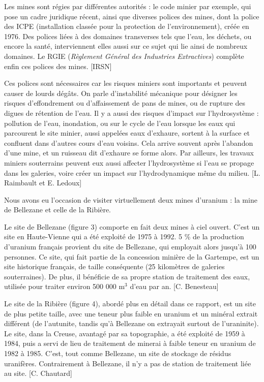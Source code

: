 \documentclass{article}
\begin{document}
Les mines sont régies par différentes autorités : le code minier par exemple, qui pose un cadre juridique récent, ainsi que diverses polices des mines, dont la police des ICPE (installation classée pour la protection de l’environnement), créée en 1976. Des polices liées à des domaines transverses tels que l’eau, les déchets, ou encore la santé, interviennent elles aussi sur ce sujet qui lie ainsi de nombreux domaines. Le RGIE (\emph{Règlement Général des Industries Extractives}) complète enfin ces polices des mines. [IRSN]

Ces polices sont nécessaires car les risques miniers sont importants et peuvent causer de lourds dégâts. On parle d’instabilité mécanique pour désigner les risques d’effondrement ou d’affaissement de pans de mines, ou de rupture des digues de rétention de l’eau. Il y a aussi des risques d’impact sur l’hydrosystème : pollution de l’eau, inondation, ou sur le cycle de l’eau lorsque les eaux qui parcourent le site minier, aussi appelées eaux d’exhaure, sortent à la surface et confluent dans d’autres cours d’eau voisins. Cela arrive souvent après l’abandon d’une mine, et un ruisseau dit d’exhaure se forme alors. Par ailleurs, les travaux miniers souterrains peuvent eux aussi affecter l’hydrosystème si l’eau se propage dans les galeries, voire créer un impact sur l’hydrodynamique même du milieu. [L. Raimbault et E. Ledoux]

Nous avons eu l’occasion de visiter virtuellement deux mines d’uranium : la mine de Bellezane et celle de la Ribière. 

Le site de Bellezane (figure 3) comporte en fait deux mines à ciel ouvert. C’est un site en Haute-Vienne qui a été exploité de 1975 à 1992. 5 \% de la production d’uranium français provient du site de Bellezane, qui employait alors jusqu’à 100 personnes. Ce site, qui fait partie de la concession minière de la Gartempe, est un site historique français, de taille conséquente (25 kilomètres de galeries souterraines). De plus, il bénéficie de sa propre station de traitement des eaux, utilisée pour traiter environ 500 000 $\text{m}^3$ d’eau par an. [C. Benesteau]

Le site de la Ribière (figure 4), abordé plus en détail dans ce rapport, est un site de plus petite taille, avec une teneur plus faible en uranium et un minéral extrait différent (de l’autunite, tandis qu’à Bellezane on extrayait surtout de l’uraninite). Le site, dans la Creuse, avantagé par sa topographie, a été exploité de 1959 à 1984, puis a servi de lieu de traitement de minerai à faible teneur en uranium de 1982 à 1985. C’est, tout comme Bellezane, un site de stockage de résidus uranifères. Contrairement à Bellezane, il n’y a pas de station de traitement liée au site. [C. Chautard]
\end{document}
